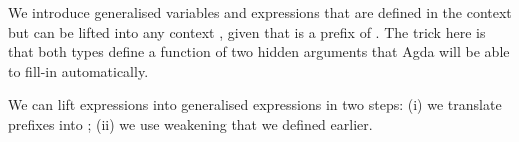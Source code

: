 We introduce generalised variables  and expressions  that
are defined in the context  but can be lifted into any context , given
that  is a prefix of .  The trick here is that both types define
a function of two hidden arguments that Agda will be able to fill-in automatically.
We can lift expressions into generalised expressions in two steps: 
(i) we translate prefixes into ; (ii) we use weakening that we defined earlier.
